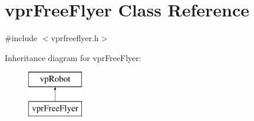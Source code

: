 \hypertarget{classvprFreeFlyer}{}\section{vpr\+Free\+Flyer Class Reference}
\label{classvprFreeFlyer}


{\ttfamily \#include $<$vprfreeflyer.\+h$>$}

Inheritance diagram for vpr\+Free\+Flyer\+:\begin{figure}[H]
\begin{center}
\leavevmode
\includegraphics[height=2.000000cm]{classvprFreeFlyer}
\end{center}
\end{figure}
